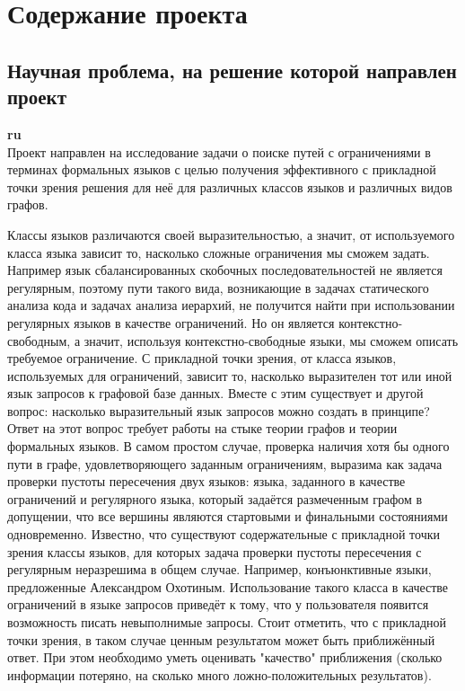 \documentclass[12pt]{article}  %
\theoremstyle{remark}
\begin{document}
\section{Содержание проекта}

\subsection{Научная проблема, на решение которой направлен проект}

\textbf{ru}\\
%
Проект направлен на исследование задачи о поиске путей с ограничениями в терминах формальных языков с целью получения эффективного с прикладной точки зрения решения для неё для различных классов языков и различных видов графов.

Классы языков различаются своей выразительностью, а значит, от используемого класса языка зависит то, насколько сложные ограничения мы сможем задать.
Например язык сбалансированных скобочных последовательностей не является регулярным, поэтому пути такого вида, возникающие в задачах статического анализа кода и задачах анализа иерархий, не получится найти при использовании регулярных языков в качестве ограничений.
Но он является контекстно-свободным, а значит, используя контекстно-свободные языки, мы сможем описать требуемое ограничение.
С прикладной точки зрения, от класса языков, используемых для ограничений, зависит то, насколько выразителен тот или иной язык запросов к графовой базе данных.
Вместе с этим существует и другой вопрос: насколько выразительный язык запросов можно создать в принципе?
Ответ на этот вопрос требует работы на стыке теории графов и теории формальных языков.
В самом простом случае, проверка наличия хотя бы одного пути в графе, удовлетворяющего заданным ограничениям, выразима как задача проверки пустоты пересечения двух языков: языка, заданного в качестве ограничений и регулярного языка, который задаётся размеченным графом в допущении, что все вершины являются стартовыми и финальными состояниями одновременно.
Известно, что существуют содержательные с прикладной точки зрения классы языков, для которых задача проверки пустоты пересечения с регулярным неразрешима в общем случае.
Например, конъюнктивные языки, предложенные Александром Охотиным.
Использование такого класса в качестве ограничений в языке запросов приведёт к тому, что у пользователя появится возможность писать невыполнимые запросы.
Стоит отметить, что с прикладной точки зрения, в таком случае ценным результатом может быть приближённый ответ.
При этом необходимо уметь оценивать "качество" приближения (сколько информации потеряно, на сколько много ложно-положительных результатов).
\end{document}
